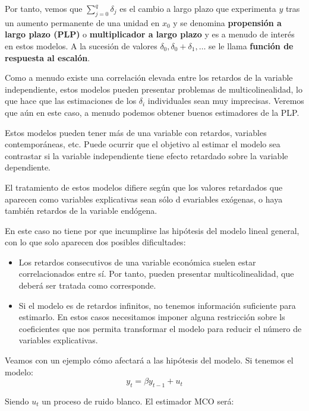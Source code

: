 Por tanto, vemos que $\sum_{j=0}^{q}\delta_j$ es el cambio a largo plazo que experimenta $y$ tras un aumento permanente de una unidad en $x_0$ y se denomina \textbf{propensi\'on a largo plazo (PLP)} o \textbf{multiplicador a largo plazo} y es a menudo de inter\'es en estos modelos. A la sucesi\'on de valores $\delta_0, \delta_0+\delta_1,\ldots$ se le llama \textbf{funci\'on de respuesta al escal\'on}.

Como a menudo existe una correlaci\'on elevada entre los retardos de la variable independiente, estos modelos pueden presentar problemas de multicolinealidad, lo que hace que las estimaciones de los $\delta_i$ individuales sean muy imprecisas. Veremos que a\'un en este caso, a menudo podemos obtener buenos estimadores de la PLP.

Estos modelos pueden tener m\'as de una variable con retardos, variables contempor\'aneas, etc. Puede ocurrir que el objetivo al estimar el modelo sea contrastar si la variable independiente tiene efecto retardado sobre la variable dependiente.

El tratamiento de estos modelos difiere seg\'un que los valores retardados que aparecen como variables explicativas sean s\'olo d evariables ex\'ogenas, o haya tambi\'en retardos de la variable end\'ogena.


En este caso no tiene por que incumplirse las hip\'otesis del modelo lineal general, con lo que solo aparecen dos posibles dificultades:
\begin{itemize}
\item Los retardos consecutivos de una variable econ\'omica suelen estar correlacionados entre s\'i. Por tanto, pueden presentar multicolinealidad, que deber\'a ser tratada como corresponde.
\item Si el modelo es de retardos infinitos, no tenemos informaci\'on suficiente para estimarlo. En estos casos necesitamos imponer alguna restricci\'on sobre ls coeficientes que nos permita transformar el modelo para reducir el n\'umero de variables explicativas.
\end{itemize}


Veamos con un ejemplo c\'omo afectar\'a a las hip\'otesis del modelo. Si tenemos el modelo:
\[y_t=\beta y_{t-1}+u_t\]

Siendo $u_t$ un proceso de ruido blanco. El estimador MCO ser\'a:

